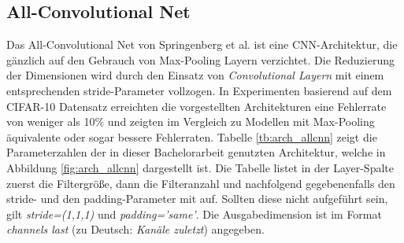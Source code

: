 \subsection{All-Convolutional Net}
Das All-Convolutional Net von Springenberg et al. \parencite{DBLP:journals/corr/SpringenbergDBR14} ist eine CNN-Architektur, die g\"anzlich auf den Gebrauch von Max-Pooling Layern verzichtet. Die Reduzierung der Dimensionen wird durch den Einsatz von \textit{Convolutional Layern} mit einem entsprechenden stride-Parameter vollzogen. In Experimenten basierend auf dem CIFAR-10 Datensatz erreichten die vorgestellten Architekturen eine Fehlerrate von weniger als 10\% und zeigten im Vergleich zu Modellen mit Max-Pooling äquivalente oder sogar bessere Fehlerraten. Tabelle \ref{tb:arch_allcnn} zeigt die Parameterzahlen der in dieser Bachelorarbeit genutzten Architektur, welche in Abbildung \ref{fig:arch_allcnn} dargestellt ist. Die Tabelle listet in der Layer-Spalte zuerst die Filtergr\"o\ss{}e, dann die Filteranzahl und nachfolgend gegebenenfalls den stride- und den padding-Parameter mit auf. Sollten diese nicht aufgef\"uhrt sein, gilt \textit{stride=(1,1,1)} und \textit{padding='same'}. Die Ausgabedimension ist im Format \textit{channels last} (zu Deutsch: \textit{Kanäle zuletzt}) angegeben. 

